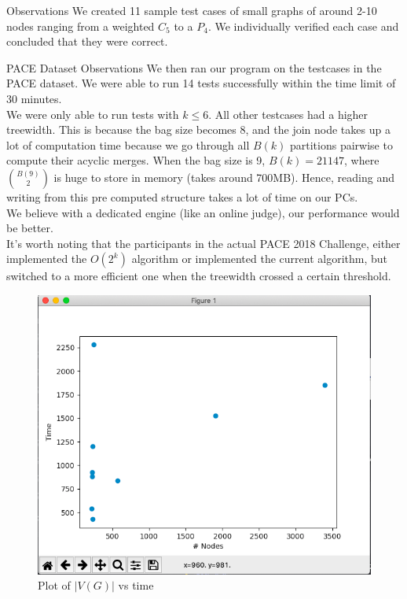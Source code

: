 \begin{section}{Observations}
	We created 11 sample test cases of small graphs of around 2-10 nodes ranging from a weighted $C_5$ to a $P_4$.  We individually verified each case and concluded that they were correct. \\
	
	\begin{subsection}{PACE Dataset Observations}
	We then ran our program on the testcases in the PACE dataset. We were able to run 14 tests successfully within the time limit of 30 minutes. \\
	
	We were only able to run tests with $k \leq 6$. All other testcases had a higher treewidth. This is because the bag size becomes $8$, and the join node takes up a lot of computation time because we go through all $B(k)$ partitions pairwise to compute their acyclic merges. When the bag size is 9, $B(k) = 21147$, where $\binom{B(9)}{2}$ is huge to store in memory (takes around 700MB). Hence, reading and writing from this pre computed structure takes a lot of time on our PCs. \\
	
		We believe with a dedicated engine (like an online judge), our performance would be better. \\
	
		It's worth noting that the participants in the actual PACE 2018 Challenge, either implemented the $O(2^k)$ algorithm or implemented the current algorithm, but switched to a more efficient one when the treewidth crossed a certain threshold. \\
	
	\begin{figure}
		\centering
		\includegraphics[scale=0.5]{NodeGraph.png}
		\caption{Plot of $|V(G)|$ vs time}
		\label{fig:nodegraph}
	\end{figure}


\end{subsection}
\end{section}
